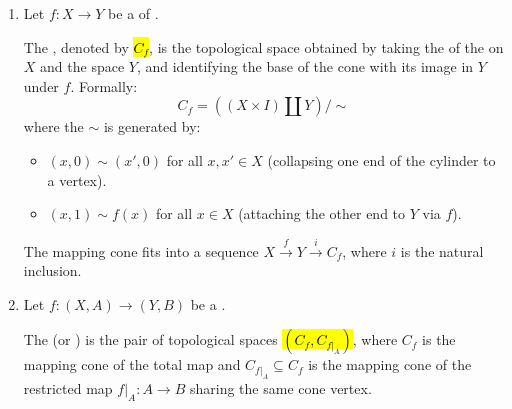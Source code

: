 \begin{definition} \label{definition:mapping_cone_of_a_map_of_topological_spaces_and_pairs}

\begin{enumerate}
    \item 
    Let $f: X \to Y$ be a  of . 

    The , denoted by \hl{$C_f$}, is the topological space obtained by taking the  of the  on $X$ and the space $Y$, and identifying the base of the cone with its image in $Y$ under $f$. Formally:
    $$ C_f = \left((X \times I) \coprod Y \right) / \sim $$
    where the  $\sim$ is generated by:
    \begin{itemize}
        \item $(x, 0) \sim (x', 0)$ for all $x, x' \in X$ (collapsing one end of the cylinder to a vertex).
        \item $(x, 1) \sim f(x)$ for all $x \in X$ (attaching the other end to $Y$ via $f$).
    \end{itemize}
    The mapping cone fits into a sequence $X \xrightarrow{f} Y \xrightarrow{i} C_f$, where $i$ is the natural inclusion.

    

    \item Let $f: (X, A) \to (Y, B)$ be a . 


    The  (or ) is the pair of topological spaces \hl{$(C_f, C_{f|_A})$}, where $C_f$ is the mapping cone of the total map and $C_{f|_A} \subseteq C_f$ is the mapping cone of the restricted map $f|_A: A \to B$ sharing the same cone vertex.
\end{enumerate}
\end{definition}